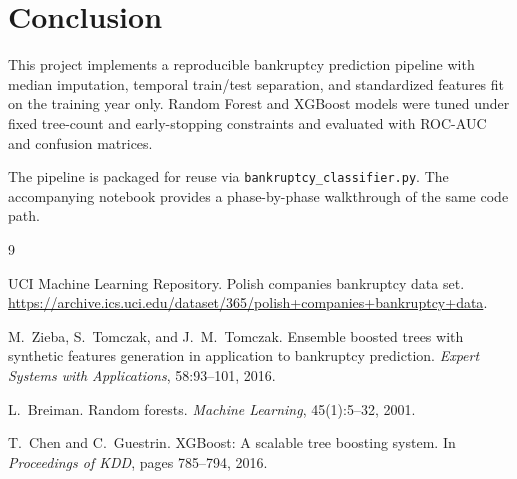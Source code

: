 \documentclass[11pt]{article}
\begin{document}
\section{Conclusion}

This project implements a reproducible bankruptcy prediction pipeline with median imputation, temporal train/test separation, and standardized features fit on the training year only. Random Forest and XGBoost models were tuned under fixed tree-count and early-stopping constraints and evaluated with ROC-AUC and confusion matrices.

The pipeline is packaged for reuse via \texttt{bankruptcy\_classifier.py}. The accompanying notebook provides a phase-by-phase walkthrough of the same code path.

\begin{thebibliography}{9}

UCI Machine Learning Repository.
\newblock Polish companies bankruptcy data set.
\newblock \url{https://archive.ics.uci.edu/dataset/365/polish+companies+bankruptcy+data}.

M.~Zieba, S.~Tomczak, and J.~M.~Tomczak.
\newblock Ensemble boosted trees with synthetic features generation in application to bankruptcy prediction.
\newblock \emph{Expert Systems with Applications}, 58:93--101, 2016.

L.~Breiman.
\newblock Random forests.
\newblock \emph{Machine Learning}, 45(1):5--32, 2001.

T.~Chen and C.~Guestrin.
\newblock XGBoost: A scalable tree boosting system.
\newblock In \emph{Proceedings of KDD}, pages 785--794, 2016.

\end{thebibliography}
\end{document}
